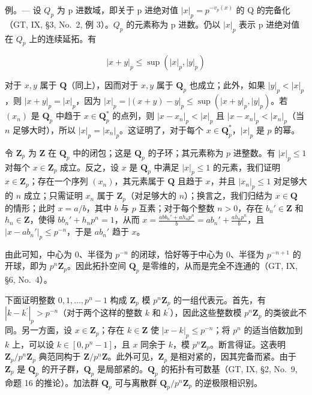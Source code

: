 例。--- 设 \(Q_{p}\) 为 p 进数域，即关于 p 进绝对值 \(|x|_{p} = p^{-v_{p}(x)}\) 的 Q 的完备化（GT, IX, §3, No.~2, 例 3）。\(Q_{p}\) 的元素称为 p 进数。仍以 \(|x|_{p}\) 表示 p 进绝对值在 \(Q_{p}\) 上的连续延拓。有

\[
| x + y | _ {p} \leqslant \sup (| x | _ {p}, | y | _ {p})
\]

对于 \(x, y\) 属于 \(\mathbf{Q}\)（同上），因而对于 \(x, y\) 属于 \(\mathbf{Q}_p\) 也成立；此外，如果 \(|y|_p < |x|_p\)，则 \(|x + y|_p = |x|_p\)，因为 \(|x|_p = |(x + y) - y|_p \leqslant \sup(|x + y|_p, |y|_p)\)。若 \((x_n)\) 是 \(\mathbf{Q}_p\) 中趋于 \(x \in \mathbf{Q}_p^*\) 的点列，则 \(|x - x_n|_p < |x|_p\) 且 \(|x - x_n|_p < |x_n|_p\)（当 \(n\) 足够大时），所以 \(|x|_p = |x_n|_p\)。这证明了，对于每个 \(x \in \mathbf{Q}_p^*\)，\(|x|_p\) 是 \(p\) 的幂。

令 \(\mathbf{Z}_p\) 为 \(\mathbf{Z}\) 在 \(\mathbf{Q}_p\) 中的闭包；这是 \(\mathbf{Q}_p\) 的子环；其元素称为 \(p\) 进整数。有 \(|x|_p \leqslant 1\) 对每个 \(x \in \mathbf{Z}_p\) 成立。反之，设 \(x\) 是 \(\mathbf{Q}_p\) 中满足 \(|x|_p \leqslant 1\) 的元素，我们证明 \(x \in \mathbf{Z}_p\)；存在一个序列 \((x_n)\)，其元素属于 \(\mathbf{Q}\) 且趋于 \(x\)，并且 \(|x_n|_p \leqslant 1\) 对足够大的 \(n\) 成立；只需证明 \(x_n\) 属于 \(\mathbf{Z}_p\)（对足够大的 \(n\)）；换言之，我们归结为 \(x \in \mathbf{Q}\) 的情形；此时 \(x = a/b\)，其中 \(b\) 与 \(p\) 互素；对于每个整数 \(n > 0\)，存在 \(b_n' \in \mathbf{Z}\) 和 \(h_n \in \mathbf{Z}\)，使得 \(bb_n' + h_np^n = 1\)，从而 \(x = \frac{abb_n' + ah_np^n}{b} = ab_n' + \frac{ah_np^n}{b}\)，且 \(|x - ab_n'|_p \leqslant p^{-n}\)，于是 \(ab_n'\) 趋于 \(x\)。

由此可知，中心为 0、半径为 \(p^{-n}\) 的闭球，恰好等于中心为 0、半径为 \(p^{-n+1}\) 的开球，即为 \(p^n\mathbf{Z}_p\)。因此拓扑空间 \(\mathbf{Q}_p\) 是零维的，从而是完全不连通的（GT, IX, §6, No.~4）。

下面证明整数 \(0,1,\ldots,p^{n}-1\) 构成 \(\mathbf{Z}_{p}\) 模 \(p^{n}\mathbf{Z}_{p}\) 的一组代表元。首先，有 \(|k-k^{\prime}|_{p}>p^{-n}\)（对于两个这样的整数 \(k\) 和 \(k^{\prime}\)），因此这些整数模 \(p^{n}\mathbf{Z}_{p}\) 的类彼此不同。另一方面，设 \(x\in\mathbf{Z}_{p}\)；存在 \(k\in\mathbf{Z}\) 使 \(|x-k|_{p}\leqslant p^{-n}\)；将 \(p^{n}\) 的适当倍数加到 \(k\) 上，可以设 \(k\in[0,p^{n}-1]\)，且 \(x\) 同余于 \(k\)，模 \(p^{n}\mathbf{Z}_{p}\)。断言得证。这表明 \(\mathbf{Z}_{p}/p^{n}\mathbf{Z}_{p}\) 典范同构于 \(\mathbf{Z}/p^{n}\mathbf{Z}\)。此外可见，\(\mathbf{Z}_{p}\) 是相对紧的，因其完备而紧。由于 \(\mathbf{Z}_{p}\) 是 \(\mathbf{Q}_{p}\) 的开子群，\(\mathbf{Q}_{p}\) 是局部紧的。\(\mathbf{Q}_{p}\) 的拓扑有可数基（GT, IX, §2, No.~9, 命题 16 的推论）。加法群 \(\mathbf{Q}_{p}\) 可与离散群 \(\mathbf{Q}_{p}/p^{n}\mathbf{Z}_{p}\) 的逆极限相识别。


